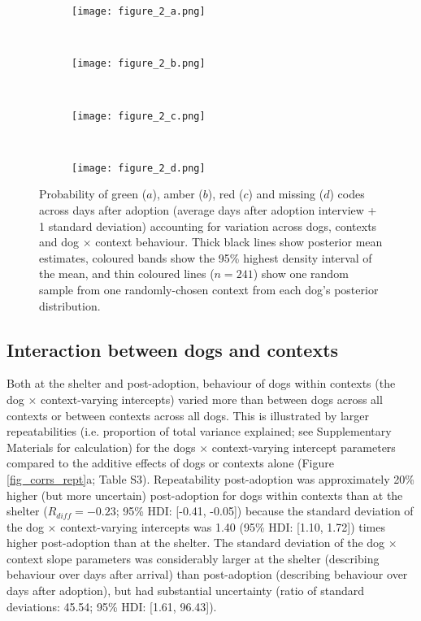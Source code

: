 \documentclass[12pt]{article}
\begin{document}
\begin{figure}
  \hspace{-2cm}%
  \begin{subfigure}{0.4\textwidth}
    \centering
    \texttt{[image: figure\_2\_a.png]}
  \end{subfigure}%
  ~%
  \hspace{-2cm}
  \begin{subfigure}{0.4\textwidth}
    \centering
    \texttt{[image: figure\_2\_b.png]}
  \end{subfigure}%
  ~%
  \hspace{-2cm}
  \begin{subfigure}{0.4\textwidth}
    \centering
    \texttt{[image: figure\_2\_c.png]}
  \end{subfigure}%
  ~%
  \hspace{-2cm}
  \begin{subfigure}{0.4\textwidth}
    \centering
    \texttt{[image: figure\_2\_d.png]}
  \end{subfigure}%

  \caption{Probability of green ($a$), amber ($b$), red ($c$) and missing ($d$) codes across days after adoption (average days after adoption interview + 1 standard deviation)  accounting for variation across dogs, contexts and dog $\times$ context behaviour. Thick black lines show posterior mean estimates, coloured bands show the 95\% highest density interval of the mean, and thin coloured lines ($n = 241$) show one random sample from one randomly-chosen context from each dog's posterior distribution.}
  \label{fig_adoption_behaviour}
\end{figure}

\subsection{Interaction between dogs and contexts}
Both at the shelter and post-adoption, behaviour of dogs within contexts (the dog $\times$ context-varying intercepts) varied more than between dogs across all contexts or between contexts across all dogs. This is illustrated by larger repeatabilities (i.e. proportion of total variance explained; see Supplementary Materials for calculation) for the dogs $\times$ context-varying intercept parameters compared to the additive effects of dogs or contexts alone (Figure \ref{fig_corrs_rept}a; Table S3). Repeatability post-adoption was approximately 20\% higher (but more uncertain) post-adoption for dogs within contexts than at the shelter ($R_{diff} = -0.23$; 95\% HDI: [-0.41, -0.05]) because the standard deviation of the dog $\times$ context-varying intercepts was 1.40 (95\% HDI: [1.10, 1.72]) times higher post-adoption than at the shelter. The standard deviation of the dog $\times$ context slope parameters was considerably larger at the shelter (describing behaviour over days after arrival) than post-adoption (describing behaviour over days after adoption), but had substantial uncertainty (ratio of standard deviations: 45.54; 95\% HDI: [1.61, 96.43]).
\end{document}
